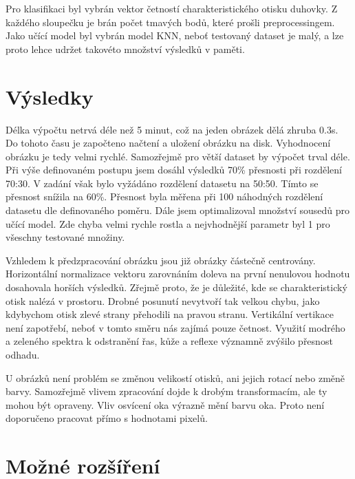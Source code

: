 \documentclass[a4paper,10pt,twocolumn]{article}
\begin{document}
Pro klasifikaci byl vybrán vektor četností charakteristického otisku duhovky. Z každého sloupečku je brán počet tmavých bodů, které prošli preprocessingem. Jako učící model byl vybrán model KNN, neboť testovaný dataset je malý, a lze proto lehce udržet takovéto množství výsledků v paměti.

\section{Výsledky}
Délka výpočtu netrvá déle než 5 minut, což na jeden obrázek dělá zhruba 0.3s. Do tohoto času je započteno načtení a uložení obrázku na disk. Vyhodnocení obrázku je tedy velmi rychlé. Samozřejmě pro větší dataset by výpočet trval déle. Při výše definovaném postupu jsem dosáhl výsledků 70\% přesnosti při rozdělení 70:30. V zadání však bylo vyžádáno rozdělení datasetu na 50:50. Tímto se přesnost snížila na 60\%. Přesnost byla měřena při 100 náhodných rozdělení datasetu dle definovaného poměru. Dále jsem optimalizoval množství sousedů pro učící model. Zde chyba velmi rychle rostla a nejvhodnější parametr byl 1 pro všeschny testované množiny.\par
Vzhledem k předzpracování obrázku jsou již obrázky částečně centrovány. Horizontální normalizace vektoru zarovnáním doleva na první nenulovou hodnotu dosahovala horších výsledků. Zřejmě proto, že je důležité, kde se charakteristický otisk nalézá v prostoru. Drobné posunutí nevytvoří tak velkou chybu, jako kdybychom otisk zlevé strany přehodili na pravou stranu. Vertikální vertikace není zapotřebí, neboť v tomto směru nás zajímá pouze četnost. Využití modrého a zeleného spektra k odstranění řas, kůže a reflexe významně zvýšilo přesnost odhadu.\par
U obrázků není problém se změnou velikostí otisků, ani jejich rotací nebo změně barvy. Samozřejmě vlivem zpracování dojde k drobým transformacím, ale ty mohou být opraveny. Vliv osvícení oka výrazně mění barvu oka. Proto není doporučeno pracovat přímo s hodnotami pixelů.

\section{Možné rozšíření}
\end{document}

